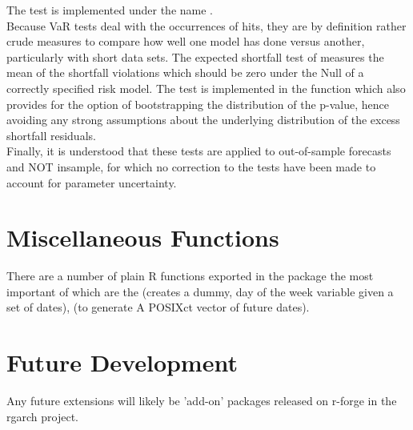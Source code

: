 The test is implemented under the name \verb@VaRDurTest@.\\
Because VaR tests deal with the occurrences of hits, they are by definition
rather crude measures to compare how well one model has done versus another,
particularly with short data sets. The expected shortfall test of \cite{McNeil2000}
measures the mean of the shortfall violations which should be zero under the Null of a
correctly specified risk model. The test is implemented in the function \verb@ESTest@
which also provides for the option of bootstrapping the distribution of the p-value,
hence avoiding any strong assumptions about the underlying distribution of the excess
shortfall residuals.\\
Finally, it is understood that these tests are applied to out-of-sample forecasts
and NOT insample, for which no correction to the tests have been made to account
for parameter uncertainty.

\section{Miscellaneous Functions}\label{section:misc}
There are a number of plain R functions exported in the package the most important
of which are the \verb@WeekDayDummy@ (creates a dummy, day of the week variable
given a set of dates), \verb@ForwardDates@ (to generate A POSIXct vector of future
dates).

\section{Future Development}\label{section:fut}
Any future extensions will likely be 'add-on' packages released on r-forge
in the rgarch project.

